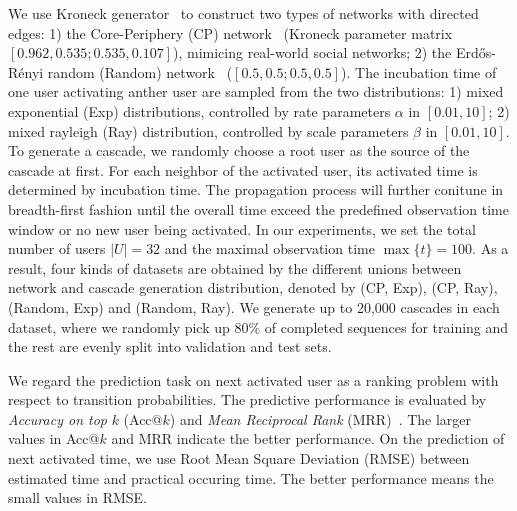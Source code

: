 We use Kroneck
generator~\cite{LeskovecICML07} to construct two types of networks with directed
edges: 1) the Core-Periphery (CP) network~\cite{LeskovecWWW08} (Kroneck
parameter matrix $[0.962, 0.535; 0.535, 0.107]$), mimicing real-world social networks; 2) the
Erd\H{o}s-R{\'e}nyi random (Random) network~\cite{Erdos60} ($[0.5, 0.5; 0.5, 0.5]$). The incubation time
of one user activating anther user are sampled from the two distributions: 1)
mixed exponential (Exp) distributions, controlled by rate parameters $\alpha$
in $[0.01, 10]$; 2) mixed rayleigh (Ray) distribution, controlled
by scale parameters $\beta$ in $[0.01, 10]$. To generate a
cascade, we randomly choose a root user as the source of the cascade at first.
For each neighbor of the activated user, its activated time is determined by
incubation time. The propagation process will further conitune  in
breadth-first fashion until the overall time exceed the predefined observation
time window or no new user being activated. In our experiments, we set the total
number of users $|U|=32$ and the maximal observation time $\max\{t\}=100$.
As a result, four kinds of datasets are obtained by the different unions between
network and cascade generation distribution, denoted by (CP, Exp), (CP, Ray),
(Random, Exp) and (Random, Ray). We generate up to
20,000 cascades in each dataset, where we randomly pick up 80\% of completed sequences for training and the rest are
 evenly split into validation and test sets. 

We regard the prediction task on next activated user as a ranking problem
with respect to transition probabilities. The predictive performance is
evaluated by \textit{Accuracy on top} $k$ (Acc@$k$) and \textit{Mean Reciprocal Rank}
(MRR)~\cite{voorhees1999trec}.
The larger values in Acc@$k$ and MRR indicate the better performance.
On the prediction of next activated time, we use Root Mean Square Deviation
(RMSE) between estimated time and practical occuring time. The better
performance means the small values in RMSE.   

